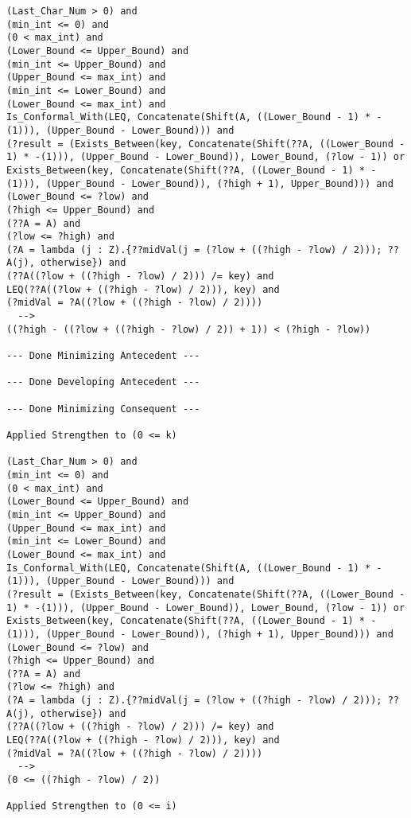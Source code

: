 \begin{lstlisting}[language=resolve]
(Last_Char_Num > 0) and
(min_int <= 0) and
(0 < max_int) and
(Lower_Bound <= Upper_Bound) and
(min_int <= Upper_Bound) and
(Upper_Bound <= max_int) and
(min_int <= Lower_Bound) and
(Lower_Bound <= max_int) and
Is_Conformal_With(LEQ, Concatenate(Shift(A, ((Lower_Bound - 1) * -(1))), (Upper_Bound - Lower_Bound))) and
(?result = (Exists_Between(key, Concatenate(Shift(??A, ((Lower_Bound - 1) * -(1))), (Upper_Bound - Lower_Bound)), Lower_Bound, (?low - 1)) or Exists_Between(key, Concatenate(Shift(??A, ((Lower_Bound - 1) * -(1))), (Upper_Bound - Lower_Bound)), (?high + 1), Upper_Bound))) and
(Lower_Bound <= ?low) and
(?high <= Upper_Bound) and
(??A = A) and
(?low <= ?high) and
(?A = lambda (j : Z).{??midVal(j = (?low + ((?high - ?low) / 2))); ??A(j), otherwise}) and
(??A((?low + ((?high - ?low) / 2))) /= key) and
LEQ(??A((?low + ((?high - ?low) / 2))), key) and
(?midVal = ?A((?low + ((?high - ?low) / 2))))
  -->
((?high - ((?low + ((?high - ?low) / 2)) + 1)) < (?high - ?low))

--- Done Minimizing Antecedent ---

--- Done Developing Antecedent ---

--- Done Minimizing Consequent ---

Applied Strengthen to (0 <= k)

(Last_Char_Num > 0) and
(min_int <= 0) and
(0 < max_int) and
(Lower_Bound <= Upper_Bound) and
(min_int <= Upper_Bound) and
(Upper_Bound <= max_int) and
(min_int <= Lower_Bound) and
(Lower_Bound <= max_int) and
Is_Conformal_With(LEQ, Concatenate(Shift(A, ((Lower_Bound - 1) * -(1))), (Upper_Bound - Lower_Bound))) and
(?result = (Exists_Between(key, Concatenate(Shift(??A, ((Lower_Bound - 1) * -(1))), (Upper_Bound - Lower_Bound)), Lower_Bound, (?low - 1)) or Exists_Between(key, Concatenate(Shift(??A, ((Lower_Bound - 1) * -(1))), (Upper_Bound - Lower_Bound)), (?high + 1), Upper_Bound))) and
(Lower_Bound <= ?low) and
(?high <= Upper_Bound) and
(??A = A) and
(?low <= ?high) and
(?A = lambda (j : Z).{??midVal(j = (?low + ((?high - ?low) / 2))); ??A(j), otherwise}) and
(??A((?low + ((?high - ?low) / 2))) /= key) and
LEQ(??A((?low + ((?high - ?low) / 2))), key) and
(?midVal = ?A((?low + ((?high - ?low) / 2))))
  -->
(0 <= ((?high - ?low) / 2))

Applied Strengthen to (0 <= i)


\end{lstlisting}
